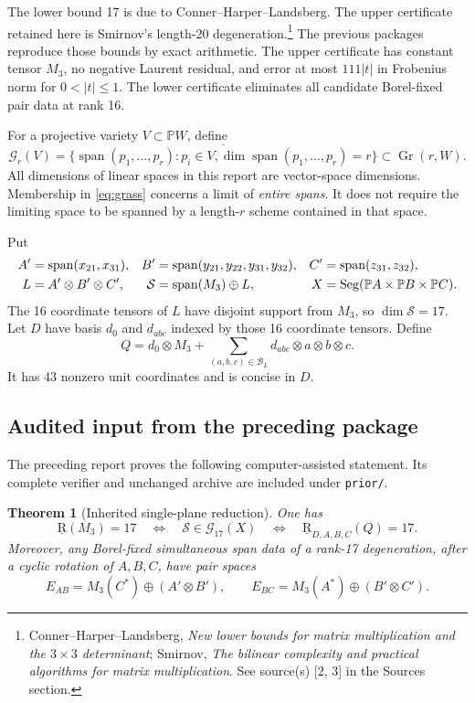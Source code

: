 \documentclass[11pt]{article}
\newtheorem{theorem}{Theorem}[section]
\theoremstyle{definition}\newtheorem{definition}[theorem]{Definition}
\theoremstyle{remark}\newtheorem{remark}[theorem]{Remark}
\newcommand{\PP}{\mathbb P}
\newcommand{\br}{\underline{\mathrm R}}
\newcommand{\Span}{\operatorname{span}}
\newcommand{\Seg}{\operatorname{Seg}}
\newcommand{\Gr}{\operatorname{Gr}}
\newcommand{\calS}{\mathcal S}
\newcommand{\calG}{\mathcal G}
\newcommand{\src}[2]{\footnote{#1. See source(s) [#2] in the Sources section.}}
\begin{document}
The lower bound 17 is due to Conner--Harper--Landsberg. The upper certificate
retained here is Smirnov's length-20 degeneration.\src{Conner--Harper--Landsberg,
\emph{New lower bounds for matrix multiplication and the $3\times3$ determinant};
Smirnov, \emph{The bilinear complexity and practical algorithms for matrix
multiplication}}{2, 3}
The previous packages reproduce those bounds by exact arithmetic. The upper
certificate has constant tensor $M_3$, no negative Laurent residual, and error
at most $111|t|$ in Frobenius norm for $0<|t|\leq1$. The lower certificate
eliminates all candidate Borel-fixed pair data at rank 16.

For a projective variety $V\subset\PP W$, define
\begin{equation}\label{eq:grass}
\calG_r(V)=\overline{\{\Span(p_1,\ldots,p_r):p_i\in V,
                      \dim\Span(p_1,\ldots,p_r)=r\}}
             \subset\Gr(r,W).
\end{equation}
All dimensions of linear spaces in this report are vector-space dimensions.
Membership in \eqref{eq:grass} concerns a limit of \emph{entire spans}. It does
not require the limiting space to be spanned by a length-$r$ scheme contained
in that space.

Put
\begin{align}\label{eq:core}
 A'&=\Span(x_{21},x_{31}),&
 B'&=\Span(y_{21},y_{22},y_{31},y_{32}),&
 C'&=\Span(z_{31},z_{32}),\notag\\
 L&=A'\otimes B'\otimes C',&
 \calS&=\Span(M_3)\oplus L,&
 X&=\Seg(\PP A\times\PP B\times\PP C).
\end{align}
The 16 coordinate tensors of $L$ have disjoint support from $M_3$, so
$\dim\calS=17$. Let $D$ have basis $d_0$ and $d_{abc}$ indexed by those 16
coordinate tensors. Define
\begin{equation}\label{eq:Q}
 Q=d_0\otimes M_3+\sum_{(a,b,c)\in\mathcal B_L}
                         d_{abc}\otimes a\otimes b\otimes c.
\end{equation}
It has 43 nonzero unit coordinates and is concise in $D$.

\subsection{Audited input from the preceding package}

The preceding report proves the following computer-assisted statement. Its
complete verifier and unchanged archive are included under \texttt{prior/}.

\begin{theorem}[Inherited single-plane reduction]\label{thm:prior}
One has
\[
 \br(M_3)=17\quad\Longleftrightarrow\quad
 \calS\in\calG_{17}(X)\quad\Longleftrightarrow\quad
 \br_{D,A,B,C}(Q)=17.
\]
Moreover, any Borel-fixed simultaneous span data of a rank-17 degeneration,
after a cyclic rotation of $A,B,C$, have pair spaces
\begin{equation}\label{eq:canonicalpairs}
 E_{AB}=M_3(C^*)\oplus(A'\otimes B'),\qquad
 E_{BC}=M_3(A^*)\oplus(B'\otimes C').
\end{equation}
\end{theorem}
\end{document}
